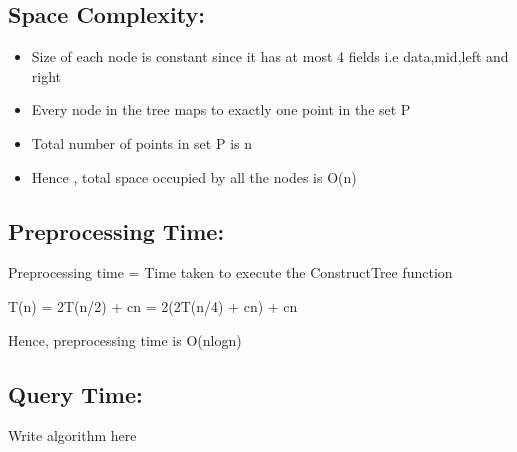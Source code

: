 \documentclass[11pt]{article}
\begin{document}
\subsection*{Space Complexity:}  
\begin{itemize}
\item Size of each node is constant since it has at most 4 fields i.e data,mid,left and right
\item Every node in the tree maps to exactly one point in the set P
\item Total number of points in set P is n
\item Hence , total space occupied by all the nodes is O(n)
\end{itemize}

\subsection*{Preprocessing Time:}

Preprocessing time = Time taken to execute the ConstructTree function

T(n) = 2T(n/2) + cn
     = 2(2T(n/4) + cn) + cn 




Hence, preprocessing time is O(nlogn)

\subsection*{Query Time:}

\begin{algorithm}
Write algorithm here
\end{algorithm}
  



\pagebreak
\end{document}
